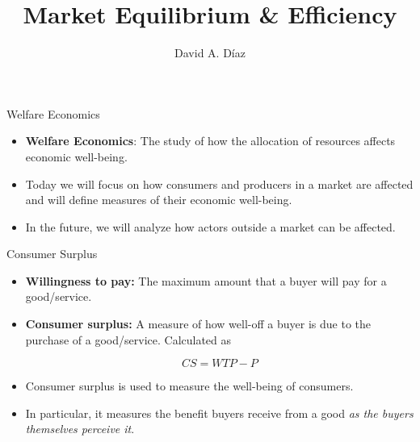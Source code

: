 \documentclass[xcolor={dvipsnames},pdf, hyperref={colorlinks=true, citecolor=ForestGreen, linkcolor=BlueViolet, urlcolor=Magenta}]{beamer}
\title{Market Equilibrium \& Efficiency}
\author{David A. D\'iaz}
\institute{UNC Chapel Hill}
\date{}
\newcommand{\defn}[1]{\textbf{#1}}
\begin{document}
 
	
	\begin{frame}
		
		\titlepage
		
	\end{frame}
	
\begin{frame}{Welfare Economics}
	\begin{itemize}
		\item \defn{Welfare Economics}: The study of how the allocation of resources affects economic well-being.
		
		\item Today we will focus on how consumers and producers in a market are affected and will define measures of their economic well-being.
		\item In the future, we will analyze how actors outside a market can be affected.
	\end{itemize}
\end{frame}

\begin{frame}{Consumer Surplus}
	
	\begin{itemize}
		\item \defn{Willingness to pay:} The maximum amount that a buyer will pay for a good/service.
		
		\item \defn{Consumer surplus:} A measure of how well-off a buyer is due to the purchase of a good/service. Calculated as 
		
		\[CS = WTP - P\]
		
		\item Consumer surplus is used to measure the well-being of consumers. 
		
		\item In particular, it measures the benefit buyers receive from a good \textit{as the buyers themselves perceive it}.
	\end{itemize}


\end{frame}
\end{document}
